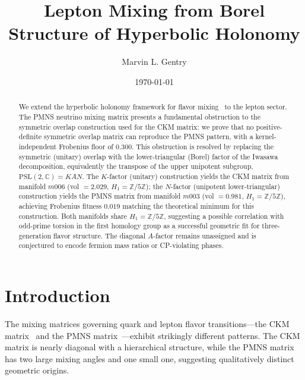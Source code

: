 \documentclass[11pt,a4paper]{article}
\newcommand{\PSL}{\mathrm{PSL}(2,\mathbb{C})}
\newcommand{\Zfive}{\mathbb{Z}/5\mathbb{Z}}
\begin{document}
\title{Lepton Mixing from Borel Structure of Hyperbolic Holonomy}

\author[1]{Marvin L. Gentry}
\date{\today}


\begin{abstract}
We extend the hyperbolic holonomy framework for flavor mixing~\cite{Gentry:CKM}
to the lepton sector. The PMNS neutrino mixing matrix presents a fundamental
obstruction to the symmetric overlap construction used for the CKM matrix:
we prove that no positive-definite symmetric overlap matrix can reproduce the
PMNS pattern, with a kernel-independent Frobenius floor of $0.300$.
This obstruction is resolved by replacing the symmetric (unitary) overlap
with the lower-triangular (Borel) factor of the Iwasawa decomposition, equivalently the transpose of the upper unipotent subgroup,
$\PSL = KAN$. The $K$-factor (unitary) construction yields the CKM matrix
from manifold $m006$ (vol $= 2.029$, $H_1 = \Zfive$); the $N$-factor
(unipotent lower-triangular) construction yields the PMNS matrix from
manifold $m003$ (vol $= 0.981$, $H_1 = \Zfive$), achieving Frobenius
fitness $0.019$ matching the theoretical minimum for this construction.
Both manifolds share $H_1 = \Zfive$, suggesting a possible correlation with odd-prime torsion in the
first homology group as a successful geometric fit for three-generation
flavor structure. The diagonal $A$-factor remains unassigned and is
conjectured to encode fermion mass ratios or CP-violating phases.
\end{abstract}


\maketitle

\section{Introduction}
\label{sec:intro}

The mixing matrices governing quark and lepton flavor transitions---the
CKM matrix~\cite{Cabibbo:1963yz,Kobayashi:1973fv} and the PMNS
matrix~\cite{Pontecorvo:1957cp,Maki:1962mu}---exhibit strikingly different
patterns. The CKM matrix is nearly diagonal with a hierarchical structure,
while the PMNS matrix has two large mixing angles and one small one,
suggesting qualitatively distinct geometric origins.
\end{document}
